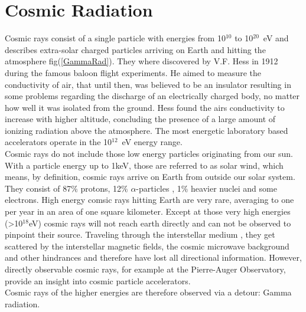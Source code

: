 \documentclass[12pt,article,type=msc,colorback,accentcolor=tud9c]{tudthesis}
\begin{document}
\section{\Large Cosmic Radiation}
%
\begin{figure}[b]
\begin{centering}
}
\caption{Gamma radiation photons (yellow) and scattered cosmic ray protons (blue) from an astrophysical source arriving on Earth. Neutrinos (grey) mostly do not interact. Picture from \cite{ungCTA}}
\label{fig:GammaRad}
\end{centering}
\end{figure}%
\noindent
Cosmic rays consist of a single particle with energies from 10$^{10}$ to 10$^{20}$~eV and describes extra-solar charged particles arriving on Earth and hitting the atmosphere fig(\ref{GammaRad}). They where discovered by V.F. Hess in 1912 during the famous baloon flight experiments. He aimed to measure the conductivity of air, that until then, was believed to be an insulator resulting in some problems regarding the discharge of an electrically charged body, no matter how well it was isolated from the ground. Hess found the airs conductivity to increase with higher altitude, concluding the presence of a large amount of ionizing radiation above the atmosphere. The most energetic laboratory based accelerators operate in the 10$^{12}$~eV energy range.\\
Cosmic rays do not include those low energy particles originating from our sun. With a particle energy up to 1keV, those are referred to as solar wind, which means, by definition, cosmic rays arrive on Earth from outside our solar system. They consist of 87$\%$ protons, 12$\%$ $\alpha$-particles , 1$\%$ heavier nuclei and some electrons. High energy comsic rays hitting Earth are very rare, averaging to one per year in an area of one square kilometer. Except at those very high energies (>10$^{18}$eV) cosmic rays will not reach earth directly and can not be observed to pinpoint their source. Traveling through the interstellar medium , they get scattered by the interstellar magnetic fields, the cosmic microwave background and other hindrances and therefore have lost all directional information. However, directly observable cosmic rays, for example at the Pierre-Auger Observatory, provide an insight into cosmic particle accelerators.\cite{CTADesign}\\
Cosmic rays of the higher energies are therefore observed via a detour: Gamma radiation. \\
\end{document}
